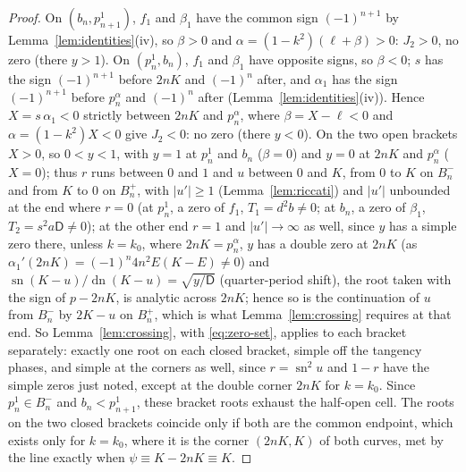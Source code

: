 \documentclass[11pt]{article}
\theoremstyle{remark}
\newcommand{\sn}{\operatorname{sn}}
\newcommand{\dn}{\operatorname{dn}}
\begin{document}
\begin{proof}
On $(b_n,p_{n+1}^1)$, $f_1$ and $\beta_1$ have the common sign
$(-1)^{n+1}$ by Lemma~\ref{lem:identities}(iv), so $\beta>0$ and
$\alpha=(1-k^2)(\ell+\beta)>0$: $J_2>0$, no zero (there $y>1$).
On $(p_n^1,b_n)$,
$f_1$ and $\beta_1$ have opposite signs, so $\beta<0$; $s$ has the sign
$(-1)^{n+1}$ before $2nK$ and $(-1)^n$ after, and $\alpha_1$ has the sign
$(-1)^{n+1}$ before $p_n^\alpha$ and $(-1)^n$ after
(Lemma~\ref{lem:identities}(iv)).  Hence $X=s\,\alpha_1<0$ strictly
between $2nK$ and $p_n^\alpha$, where $\beta=X-\ell<0$ and
$\alpha=(1-k^2)X<0$ give $J_2<0$: no zero (there $y<0$).  On the
two open brackets $X>0$,
so $0<y<1$, with $y=1$ at $p_n^1$ and $b_n$ ($\beta=0$) and $y=0$ at $2nK$
and $p_n^\alpha$ ($X=0$); thus $r$ runs between $0$ and $1$ and $u$ between
$0$ and $K$, from $0$ to $K$ on $B_n^-$ and from $K$ to $0$ on $B_n^+$,
with $|u'|\ge1$ (Lemma~\ref{lem:riccati}) and $|u'|$ unbounded at the end
where $r=0$ (at
$p_n^1$, a zero of $f_1$, $T_1=d^2b\ne0$; at $b_n$, a zero of $\beta_1$,
$T_2=s^2a\mathsf D\ne0$); at the other end $r=1$ and $|u'|\to\infty$ as
well, since $y$ has a simple zero there, unless $k=k_0$, where
$2nK=p_n^\alpha$, $y$ has a double zero at $2nK$ (as
$\alpha_1'(2nK)=(-1)^n4n^2E(K-E)\ne0$) and
$\sn(K-u)/\dn(K-u)=\sqrt{y/\mathsf D}$ (quarter-period shift), the root
taken with the sign of $p-2nK$, is analytic across $2nK$; hence so is the
continuation of $u$ from $B_n^-$ by $2K-u$ on $B_n^+$, which is what
Lemma~\ref{lem:crossing} requires at that end.  So
Lemma~\ref{lem:crossing}, with \eqref{eq:zero-set}, applies to each bracket
separately: exactly one root on each closed bracket, simple off the
tangency phases, and simple at the corners as well, since $r=\sn^2u$ and
$1-r$ have the simple zeros just noted, except at the double corner $2nK$
for $k=k_0$.  Since $p_n^1\in B_n^-$ and
$b_n<p_{n+1}^1$, these bracket roots exhaust the half-open cell.  The roots on the
two closed brackets coincide only if both are the common endpoint, which
exists only for $k=k_0$, where it is the corner $(2nK,K)$ of both curves,
met by the line exactly when $\psi\equiv K-2nK\equiv K$.
\end{proof}
\end{document}
